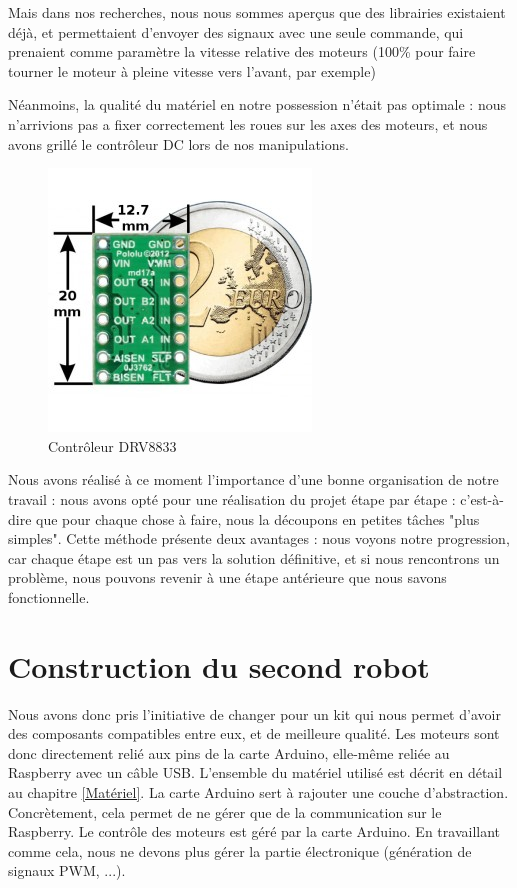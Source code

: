 \documentclass[12pt,a4paper]{report}
\begin{document}
Mais dans nos recherches, nous nous sommes aperçus que des librairies existaient déjà, et permettaient d'envoyer des signaux avec une seule commande, qui prenaient comme paramètre la vitesse relative des moteurs (100\% pour faire tourner le moteur à pleine vitesse vers l'avant, par exemple) 

Néanmoins, la qualité du matériel en notre possession n'était pas optimale : nous n'arrivions pas a fixer correctement les roues sur les axes des moteurs, et nous avons grillé le contrôleur DC lors de nos manipulations.

\begin{figure}[hf!]
\center
\includegraphics[scale=0.5]{images/y.jpg}
\caption{Contrôleur DRV8833}
\end{figure}

Nous avons réalisé à ce moment l'importance d'une bonne organisation de notre travail : nous avons opté pour une réalisation du projet étape par étape : c'est-à-dire que pour chaque chose à faire, nous la découpons en petites tâches "plus simples". Cette méthode présente deux avantages : nous voyons notre progression, car chaque étape est un pas vers la solution définitive, et si nous rencontrons un problème, nous pouvons revenir à une étape antérieure que nous savons fonctionnelle.

\section{Construction du second robot}

Nous avons donc pris l'initiative de changer pour un kit qui nous permet d'avoir des composants compatibles entre eux, et de meilleure qualité.
Les moteurs sont donc directement relié aux pins de la carte Arduino, elle-même reliée au Raspberry avec un câble USB.
L'ensemble du matériel utilisé est décrit en détail au chapitre \ref{Matériel}. La carte Arduino sert à rajouter une couche d'abstraction. Concrètement, cela permet de ne gérer que de la communication sur le Raspberry. Le contrôle des moteurs est géré par la carte Arduino. En travaillant comme cela, nous ne devons plus gérer la partie électronique (génération de signaux PWM, ...).
\end{document}
